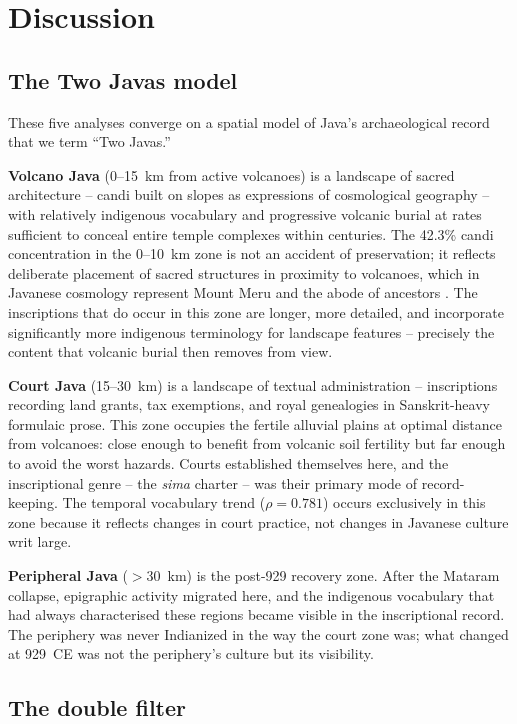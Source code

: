 \documentclass[12pt]{article}
\begin{document}
\section{Discussion}

\subsection{The Two Javas model}

These five analyses converge on a spatial model of Java's archaeological record that we term ``Two Javas.''

\textbf{Volcano Java} (0--15~km from active volcanoes) is a landscape of sacred architecture -- candi built on slopes as expressions of cosmological geography -- with relatively indigenous vocabulary and progressive volcanic burial at rates sufficient to conceal entire temple complexes within centuries.
The 42.3\% candi concentration in the 0--10~km zone is not an accident of preservation; it reflects deliberate placement of sacred structures in proximity to volcanoes, which in Javanese cosmology represent Mount Meru and the abode of ancestors \citep{Degroot2009, Dumarcay1986}.
The inscriptions that do occur in this zone are longer, more detailed, and incorporate significantly more indigenous terminology for landscape features -- precisely the content that volcanic burial then removes from view.

\textbf{Court Java} (15--30~km) is a landscape of textual administration -- inscriptions recording land grants, tax exemptions, and royal genealogies in Sanskrit-heavy formulaic prose.
This zone occupies the fertile alluvial plains at optimal distance from volcanoes: close enough to benefit from volcanic soil fertility but far enough to avoid the worst hazards.
Courts established themselves here, and the inscriptional genre -- the \textit{sima} charter -- was their primary mode of record-keeping.
The temporal vocabulary trend ($\rho = 0.781$) occurs exclusively in this zone because it reflects changes in court practice, not changes in Javanese culture writ large.

\textbf{Peripheral Java} ($>$30~km) is the post-929 recovery zone.
After the Mataram collapse, epigraphic activity migrated here, and the indigenous vocabulary that had always characterised these regions became visible in the inscriptional record.
The periphery was never Indianized in the way the court zone was; what changed at 929~CE was not the periphery's culture but its visibility.

\subsection{The double filter}
\end{document}
